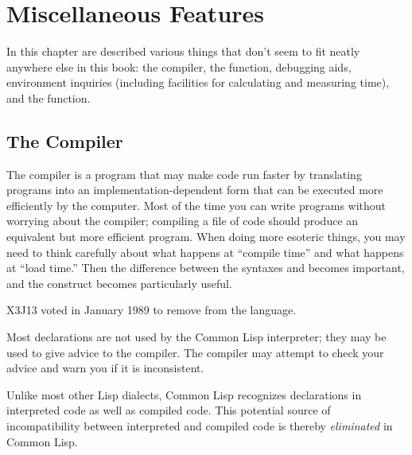 
\clearpage\def\pagestatus{FINAL PROOF}

\chapter{Miscellaneous Features}

In this chapter are described various things that don't
seem to fit neatly anywhere else in this book:
the compiler, the 
function, debugging aids, environment inquiries (including facilities
for calculating and measuring time), and the  function.

\section{The Compiler}
\label{COMPILER-SECTION}

\begin{obsolete}\noindent
The compiler is a program that may make code run faster by translating
programs into an implementation-dependent form that can
be executed more efficiently by the computer.  Most of the time
you can write programs without worrying about the compiler;
compiling a file of code should produce an equivalent but more
efficient program.  When doing more esoteric things, you may need to
think carefully about what happens at ``compile time'' and what happens
at ``load time.''  Then the difference between the syntaxes 
and \cd{\#,} becomes important, and the  construct
becomes particularly useful.
\end{obsolete}

\begin{newer}
X3J13 voted in January 1989
 to remove \cd{\#,} from the language.
\end{newer}

\everypar{}
Most declarations are not used by the Common Lisp interpreter;
they may be used to give advice to the compiler.  The compiler may attempt
to check your advice and warn you if it is inconsistent.

Unlike most other Lisp dialects, Common Lisp recognizes 
declarations in interpreted code as well as compiled code.
This potential source of incompatibility between interpreted and compiled
code is thereby {\it eliminated} in Common Lisp.

